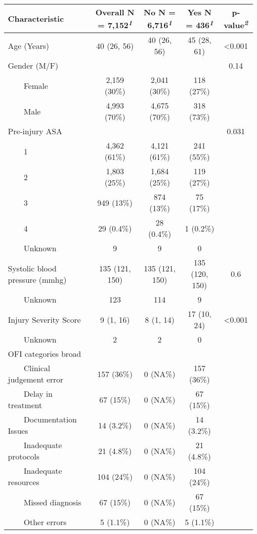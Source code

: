 \documentclass[
]{article}
\begin{document}
\begin{table}[!t]
\fontsize{12.0pt}{14.4pt}\selectfont
\begin{tabular*}{\linewidth}{@{\extracolsep{\fill}}lcccc}
\toprule
\textbf{Characteristic} & \textbf{Overall}  N = 7,152\textsuperscript{\textit{1}} & \textbf{No}  N = 6,716\textsuperscript{\textit{1}} & \textbf{Yes}  N = 436\textsuperscript{\textit{1}} & \textbf{p-value}\textsuperscript{\textit{2}} \\ 
\midrule\addlinespace[2.5pt]
Age (Years) & 40 (26, 56) & 40 (26, 56) & 45 (28, 61) & <0.001 \\ 
Gender (M/F) &  &  &  & 0.14 \\ 
    Female & 2,159 (30\%) & 2,041 (30\%) & 118 (27\%) &  \\ 
    Male & 4,993 (70\%) & 4,675 (70\%) & 318 (73\%) &  \\ 
Pre-injury ASA &  &  &  & 0.031 \\ 
    1 & 4,362 (61\%) & 4,121 (61\%) & 241 (55\%) &  \\ 
    2 & 1,803 (25\%) & 1,684 (25\%) & 119 (27\%) &  \\ 
    3 & 949 (13\%) & 874 (13\%) & 75 (17\%) &  \\ 
    4 & 29 (0.4\%) & 28 (0.4\%) & 1 (0.2\%) &  \\ 
    Unknown & 9 & 9 & 0 &  \\ 
Systolic blood pressure (mmhg) & 135 (121, 150) & 135 (121, 150) & 135 (120, 150) & 0.6 \\ 
    Unknown & 123 & 114 & 9 &  \\ 
Injury Severity Score & 9 (1, 16) & 8 (1, 14) & 17 (10, 24) & <0.001 \\ 
    Unknown & 2 & 2 & 0 &  \\ 
OFI categories broad &  &  &  &  \\ 
    Clinical judgement error & 157 (36\%) & 0 (NA\%) & 157 (36\%) &  \\ 
    Delay in treatment & 67 (15\%) & 0 (NA\%) & 67 (15\%) &  \\ 
    Documentation Issues & 14 (3.2\%) & 0 (NA\%) & 14 (3.2\%) &  \\ 
    Inadequate protocols & 21 (4.8\%) & 0 (NA\%) & 21 (4.8\%) &  \\ 
    Inadequate resources & 104 (24\%) & 0 (NA\%) & 104 (24\%) &  \\ 
    Missed diagnosis & 67 (15\%) & 0 (NA\%) & 67 (15\%) &  \\ 
    Other errors & 5 (1.1\%) & 0 (NA\%) & 5 (1.1\%) &  \\ 

\end{tabular*}
\end{table}
\end{document}
